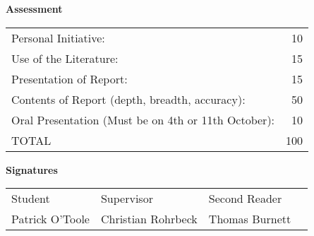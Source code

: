 \documentclass[11pt]{article}
\newcommand{\student}{Patrick O'Toole}
\newcommand{\supervisor}{Christian Rohrbeck}
\newcommand{\CoD}{Thomas Burnett}
\begin{document}


\begin{center}
\textbf{Assessment}\\[6pt]
\begin{tabular}{lr}
Personal Initiative: &10\\
Use of the Literature: &15\\
Presentation of Report: &15\\
Contents of Report (depth, breadth, accuracy): &50 \\
Oral Presentation (Must be on 4th or 11th October): & 10\\
\cline{2-2}
TOTAL&100
\end{tabular}
\end{center}


\begin{center}
\textbf{Signatures}\\[6pt]
\begin{tabular}[t]{*{4}{p{1.2in}}}
Student&Supervisor&Second Reader\\[1in]
\student&\supervisor&\CoD
\end{tabular}
\end{center}
\end{document}
